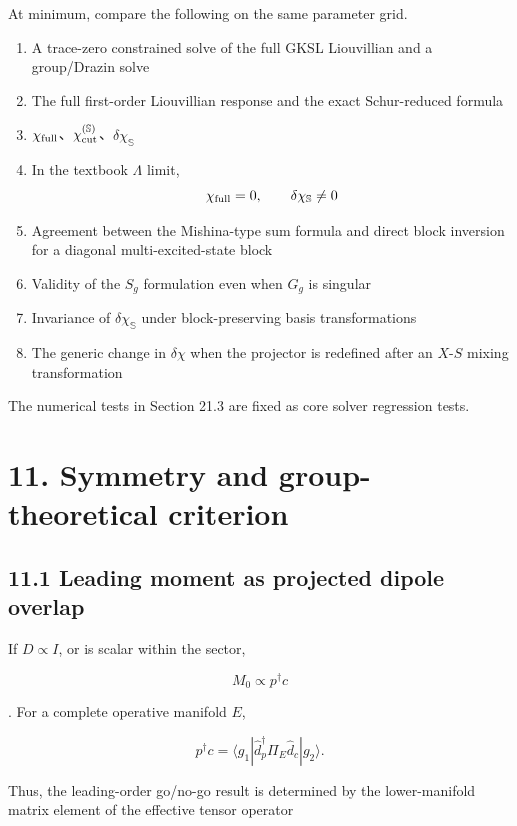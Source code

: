 \documentclass[
  10pt,
  a4paper,
]{article}
\providecommand{\tightlist}{%
  \setlength{\itemsep}{0pt}\setlength{\parskip}{0pt}}
\begin{document}
At minimum, compare the following on the same parameter grid.

\begin{enumerate}
\def\labelenumi{\arabic{enumi}.}
\tightlist
\item
  A trace-zero constrained solve of the full GKSL Liouvillian and a
  group/Drazin solve
\item
  The full first-order Liouvillian response and the exact Schur-reduced
  formula
\item
  \(\chi_{\rm full}\)、\(\chi_{\rm cut}^{(\mathbb S)}\)、\(\delta\chi_{\mathbb S}\)
\item
  In the textbook \(\Lambda\) limit, \[
  \chi_{\rm full}=0,
  \qquad
  \delta\chi_{\mathbb S}\neq0
  \]
\item
  Agreement between the Mishina-type sum formula and direct block
  inversion for a diagonal multi-excited-state block
\item
  Validity of the \(S_g\) formulation even when \(G_g\) is singular
\item
  Invariance of \(\delta\chi_{\mathbb S}\) under block-preserving basis
  transformations
\item
  The generic change in \(\delta\chi\) when the projector is redefined
  after an \(X\)-\(S\) mixing transformation
\end{enumerate}

The numerical tests in Section 21.3 are fixed as core solver regression
tests.

\section{11. Symmetry and group-theoretical
criterion}\label{symmetry-and-group-theoretical-criterion}

\subsection{11.1 Leading moment as projected dipole
overlap}\label{leading-moment-as-projected-dipole-overlap}

If \(D\propto I\), or is scalar within the sector,

\[
M_0\propto p^\dagger c
\]

. For a complete operative manifold \(E\),

\[
p^\dagger c
=\langle g_1|
\hat d_p^\dagger\Pi_E\hat d_c
|g_2\rangle.
\]

Thus, the leading-order go/no-go result is determined by the
lower-manifold matrix element of the effective tensor operator
\end{document}
